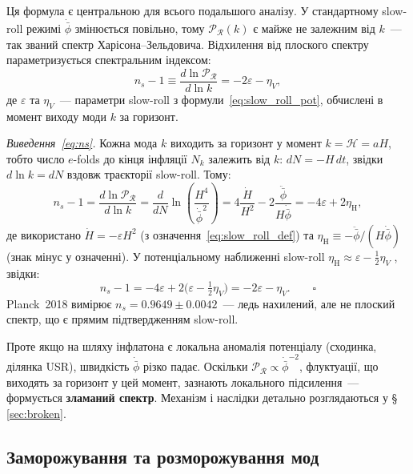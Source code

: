 \documentclass[12pt, a4paper]{article}
\begin{document}
Ця формула є центральною для всього подальшого аналізу. У
стандартному slow-roll режимі $\dot{\bar\phi}$ змінюється
повільно, тому $\mathcal{P}_{\mathcal{R}}(k)$ є майже не
залежним від $k$~--- так званий спектр Харісона--Зельдовича.
Відхилення від плоского спектру параметризується спектральним
індексом:
\begin{equation}\label{eq:ns}
  n_s - 1 \equiv \frac{d\ln\mathcal{P}_{\mathcal{R}}}{d\ln k}
            = -2\varepsilon - \eta_V,
\end{equation}
де $\varepsilon$ та $\eta_V$~--- параметри slow-roll з
формули~\eqref{eq:slow_roll_pot}, обчислені в момент виходу
моди $k$ за горизонт.

\textit{Виведення~\eqref{eq:ns}.}
Кожна мода $k$ виходить за горизонт у момент $k = \mathcal{H}
= aH$, тобто число $e$-folds до кінця інфляції $N_k$ залежить
від $k$: $dN = -H\,dt$, звідки $d\ln k = dN$ вздовж траєкторії
slow-roll. Тому:
\begin{equation*}
  n_s - 1
    = \frac{d\ln\mathcal{P}_{\mathcal{R}}}{d\ln k}
    = \frac{d}{dN}\ln\!\left(\frac{H^4}{\dot{\bar\phi}^2}\right)
    = 4\frac{\dot H}{H^2} - 2\frac{\ddot{\bar\phi}}{H\dot{\bar\phi}}
    = -4\varepsilon + 2\eta_\mathrm{H},
\end{equation*}
де використано $\dot H = -\varepsilon H^2$ (з означення~\eqref{eq:slow_roll_def})
та $\eta_\mathrm{H} \equiv -\ddot{\bar\phi}/(H\dot{\bar\phi})$
(знак мінус у означенні).
У потенціальному наближенні slow-roll $\eta_\mathrm{H} \approx
\varepsilon - \tfrac{1}{2}\eta_V$ \cite{mukhanov_2005}, звідки:
\begin{equation*}
  n_s - 1 = -4\varepsilon + 2\bigl(\varepsilon -
  \tfrac{1}{2}\eta_V\bigr) = -2\varepsilon - \eta_V. \qquad\square
\end{equation*}
Planck~2018 вимірює $n_s = 0.9649 \pm 0.0042$~--- ледь нахилений,
але не плоский спектр, що є прямим підтвердженням slow-roll.

Проте якщо на шляху інфлатона є локальна аномалія потенціалу
(сходинка, ділянка USR), швидкість $\dot{\bar\phi}$ різко падає.
Оскільки $\mathcal{P}_{\mathcal{R}} \propto \dot{\bar\phi}^{-2}$,
флуктуації, що виходять за горизонт у цей момент, зазнають
локального підсилення~--- формується \textbf{зламаний спектр}.
Механізм і наслідки детально розглядаються у
§\,\ref{sec:broken}.

\subsection{Заморожування та розморожування мод}
\end{document}
